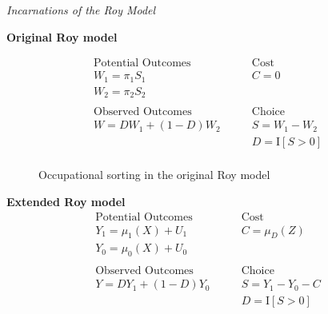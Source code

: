 \begin{frame}\begin{center}
		\LARGE\textit{Incarnations of the Roy Model}
\end{center}\end{frame}
\begin{frame}
	\textbf{Original Roy model}

	\begin{align*}
	\text{Potential Outcomes} &\qquad \text{Cost} \\
	W_1 = \pi_1 S_1      &\qquad C = 0 \\
	W_2 = \pi_2 S_2       &\qquad \\
	& \\
	\text{Observed Outcomes } &\qquad \text{Choice} \\
	W = D W_1 + (1 - D)W_2 &\qquad S = W_1 - W_2 \\
	&\qquad D = \mathrm{I}[S > 0] \\
	\end{align*}
\end{frame}
\begin{frame}
	\begin{figure}[htp]\centering
		\caption{Occupational sorting in the original Roy model}
	\end{figure}
\end{frame}
\begin{frame}
	\textbf{Extended Roy model}
	\begin{align*}
	\text{Potential Outcomes} &\qquad \text{Cost} \\
	Y_1 = \mu_1(X) + U_1      &\qquad C = \mu_D(Z) \\
	Y_0 = \mu_0(X) + U_0      &\qquad \\
	& \\
	\text{Observed Outcomes } &\qquad \text{Choice} \\
	Y = D Y_1 + (1 - D)Y_0 &\qquad S = Y_1 - Y_0 - C \\
	&\qquad D = \mathrm{I}[S > 0] \\
	\end{align*}
\end{frame}
